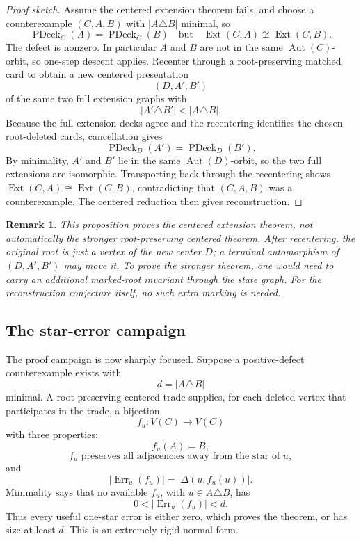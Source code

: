 \documentclass[11pt]{article}
\newtheorem{remark}{Remark}
\newcommand{\PDeck}{\operatorname{PDeck}}
\newcommand{\Ext}{\operatorname{Ext}}
\newcommand{\Aut}{\operatorname{Aut}}
\newcommand{\Err}{\operatorname{Err}}
\begin{document}
\begin{proof}[Proof sketch]
Assume the centered extension theorem fails, and choose a counterexample
\((C,A,B)\) with \(|A\triangle B|\) minimal, so
\[
  \PDeck_C(A)=\PDeck_C(B)
  \quad\text{but}\quad
  \Ext(C,A)\not\cong\Ext(C,B).
\]
The defect is nonzero.  In particular \(A\) and \(B\) are not in the same
\(\Aut(C)\)-orbit, so one-step descent applies.  Recenter through a
root-preserving matched card to obtain a new centered presentation
\[
  (D,A',B')
\]
of the same two full extension graphs with
\[
  |A'\triangle B'| < |A\triangle B|.
\]
Because the full extension decks agree and the recentering identifies the
chosen root-deleted cards, cancellation gives
\[
  \PDeck_D(A')=\PDeck_D(B').
\]
By minimality, \(A'\) and \(B'\) lie in the same \(\Aut(D)\)-orbit, so the two
full extensions are isomorphic.  Transporting back through the recentering
shows \(\Ext(C,A)\cong\Ext(C,B)\), contradicting that \((C,A,B)\) was a
counterexample.  The centered reduction then gives reconstruction.
\end{proof}

\begin{remark}
This proposition proves the centered extension theorem, not automatically the
stronger root-preserving centered theorem.  After recentering, the original
root is just a vertex of the new center \(D\); a terminal automorphism of
\((D,A',B')\) may move it.  To prove the stronger theorem, one would need to
carry an additional marked-root invariant through the state graph.  For the
reconstruction conjecture itself, no such extra marking is needed.
\end{remark}

\subsection{The star-error campaign}

The proof campaign is now sharply focused.  Suppose a positive-defect
counterexample exists with
\[
  d=|A\triangle B|
\]
minimal.  A root-preserving centered trade supplies, for each deleted vertex
that participates in the trade, a bijection
\[
  f_u:V(C)\to V(C)
\]
with three properties:
\[
  f_u(A)=B,
\]
\[
  f_u \text{ preserves all adjacencies away from the star of } u,
\]
and
\[
  |\Err_u(f_u)|=|\Delta(u,f_u(u))|.
\]
Minimality says that no available \(f_u\), with \(u\in A\triangle B\), has
\[
  0<|\Err_u(f_u)|<d.
\]
Thus every useful one-star error is either zero, which proves the theorem, or
has size at least \(d\).  This is an extremely rigid normal form.
\end{document}
